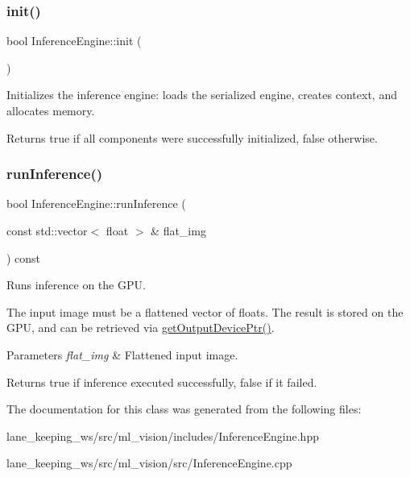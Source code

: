 \subsubsection{\texorpdfstring{init()}{init()}}
{\footnotesize\ttfamily bool Inference\+Engine\+::init (\begin{DoxyParamCaption}{ }\end{DoxyParamCaption})}



Initializes the inference engine\+: loads the serialized engine, creates context, and allocates memory. 

\begin{DoxyReturn}{Returns}
true if all components were successfully initialized, false otherwise. 
\end{DoxyReturn}
\mbox{\label{classInferenceEngine_aef205091b7d9dd1614e17765c5549144}} 
\subsubsection{\texorpdfstring{run\+Inference()}{runInference()}}
{\footnotesize\ttfamily bool Inference\+Engine\+::run\+Inference (\begin{DoxyParamCaption}\item[{const std\+::vector$<$ float $>$ \&}]{flat\+\_\+img }\end{DoxyParamCaption}) const}



Runs inference on the G\+PU. 

The input image must be a flattened vector of floats. The result is stored on the G\+PU, and can be retrieved via \hyperlink{classInferenceEngine_a4d28ceb717d506d3984dc5742dec831d}{get\+Output\+Device\+Ptr()}.


\begin{DoxyParams}{Parameters}
{\em flat\+\_\+img} & Flattened input image. \\
\hline
\end{DoxyParams}
\begin{DoxyReturn}{Returns}
true if inference executed successfully, false if it failed. 
\end{DoxyReturn}


The documentation for this class was generated from the following files\+:\begin{DoxyCompactItemize}
\item 
lane\+\_\+keeping\+\_\+ws/src/ml\+\_\+vision/includes/Inference\+Engine.\+hpp\item 
lane\+\_\+keeping\+\_\+ws/src/ml\+\_\+vision/src/Inference\+Engine.\+cpp\end{DoxyCompactItemize}
